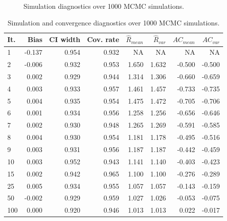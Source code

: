 \documentclass[article]{jss}
\begin{document}
\begin{figure}[h]
  \caption{Simulation diagnostics over 1000 MCMC simulations.}
    \label{fig:sim}
\end{figure}

\begin{table}[ht]
\centering
\caption{Simulation and convergence diagnostics over 1000 MCMC simulations.} 
\label{tab:results}
\begin{tabular}{lrrrrrrr}
  \hline
It. & Bias & CI width & Cov. rate & $\widehat{R}_{mean}$ & $\widehat{R}_{var}$ & $AC_{mean}$ & $AC_{var}$ \\ 
  \hline
   1 & -0.137 & 0.954 & 0.932 & NA & NA & NA & NA \\ 
     2 & -0.006 & 0.932 & 0.953 & 1.650 & 1.632 & -0.500 & -0.500 \\ 
     3 & 0.002 & 0.929 & 0.944 & 1.314 & 1.306 & -0.660 & -0.659 \\ 
     4 & 0.003 & 0.933 & 0.957 & 1.461 & 1.457 & -0.733 & -0.735 \\ 
     5 & 0.004 & 0.935 & 0.954 & 1.475 & 1.472 & -0.705 & -0.706 \\ 
     6 & 0.001 & 0.934 & 0.956 & 1.258 & 1.256 & -0.656 & -0.646 \\ 
     7 & 0.002 & 0.930 & 0.948 & 1.265 & 1.269 & -0.591 & -0.585 \\ 
     8 & 0.004 & 0.930 & 0.954 & 1.181 & 1.178 & -0.495 & -0.516 \\ 
     9 & 0.003 & 0.931 & 0.956 & 1.187 & 1.187 & -0.442 & -0.459 \\ 
    10 & 0.003 & 0.952 & 0.943 & 1.141 & 1.140 & -0.403 & -0.423 \\ 
    15 & 0.002 & 0.942 & 0.965 & 1.100 & 1.100 & -0.276 & -0.289 \\ 
    25 & 0.005 & 0.934 & 0.955 & 1.057 & 1.057 & -0.143 & -0.159 \\ 
    50 & -0.002 & 0.929 & 0.959 & 1.027 & 1.026 & -0.053 & -0.075 \\ 
   100 & 0.000 & 0.920 & 0.946 & 1.013 & 1.013 & 0.022 & -0.017 \\ 
   \hline
\end{tabular}
\end{table}
\end{document}

